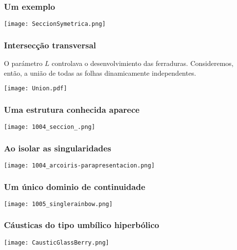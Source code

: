\documentclass{beamer}
\begin{document}
\begin{frame}
  \frametitle{Um exemplo}
  \begin{center}
  \texttt{[image: SeccionSymetrica.png]}
  \end{center}
\end{frame}



\begin{frame}
  \frametitle{Intersecção transversal}
  O parámetro $L$ controlava o desenvolvimiento das ferraduras.
  Consideremos, então, a união de todas as folhas dinamicamente
  independentes.
\begin{center}
  \texttt{[image: Union.pdf]}
\end{center}
\end{frame}




\begin{frame}
  \frametitle{Uma estrutura conhecida aparece}
  \begin{center}
    \texttt{[image: 1004\_seccion\_.png]}
  \end{center}
\end{frame}

\begin{frame}
  \frametitle{Ao isolar as singularidades}
  \begin{center}
    \texttt{[image: 1004\_arcoiris-parapresentacion.png]}
  \end{center}
\end{frame}


\begin{frame}
  \frametitle{Um único dominio de continuidade}
  \begin{center}
    \texttt{[image: 1005\_singlerainbow.png]}
  \end{center}
\end{frame}


\begin{frame}
  \frametitle{Cáusticas do tipo umbílico hiperbólico}
  \begin{center}
    \texttt{[image: CausticGlassBerry.png]}
  \end{center}
\end{frame}  
\end{document}
